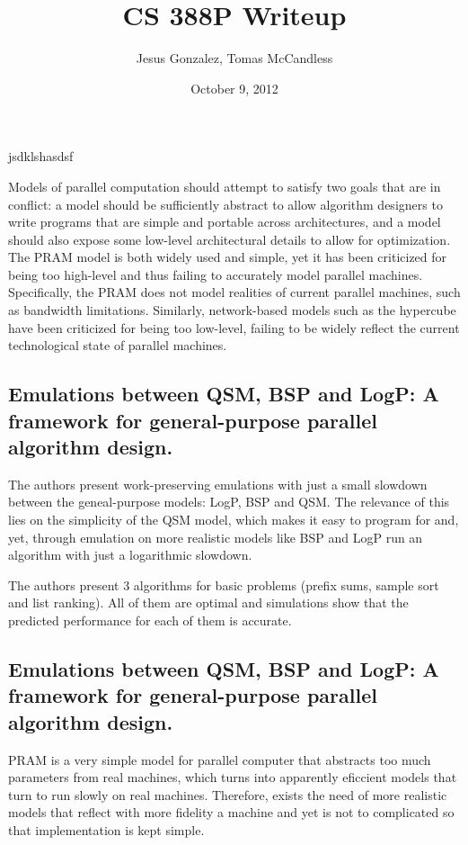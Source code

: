 \documentclass[12pt,a4paper]{article}
\author{Jesus Gonzalez, Tomas McCandless}
\title{CS 388P Writeup}
\date{October 9, 2012}
\begin{document}
\maketitle
{}
\doublespace

jsdklshasdsf \cite{Gib99} \cite{Vlr03}

Models of parallel computation should attempt to satisfy two goals that are in conflict: a model should be sufficiently abstract to allow algorithm designers to
write programs that are simple and portable across architectures, and a model should also expose some low-level architectural details to allow for optimization. 
The PRAM model is both widely used and simple, yet it has been criticized for being too high-level and thus failing to accurately model parallel machines.
Specifically, the PRAM does not model realities of current parallel machines, such as bandwidth limitations. Similarly, network-based models such as the
hypercube have been criticized for being too low-level, failing to be widely reflect the current technological state of parallel machines.

\subsection{Emulations between QSM, BSP and LogP: A framework for general-purpose parallel algorithm design. \cite{Vlr03}}
The authors present work-preserving emulations with just a small slowdown between the geneal-purpose models: LogP, BSP and QSM. The relevance of this lies on the simplicity of the QSM model, which makes it easy to program for and, yet, through emulation on more realistic models like BSP and LogP run an algorithm with just a logarithmic slowdown.

The authors present 3 algorithms for basic problems (prefix sums, sample sort and list ranking). All of them are optimal and simulations show that the predicted performance for each of them is accurate.

\subsection{Emulations between QSM, BSP and LogP: A framework for general-purpose parallel algorithm design. \cite{Vlr03}}
PRAM is a very simple model for parallel computer that abstracts too much parameters from real machines, which turns into apparently eficcient models that turn to run slowly on real machines. Therefore, exists the need of more realistic models that reflect with more fidelity a machine and yet is not to complicated so that implementation is kept simple.
\end{document}
